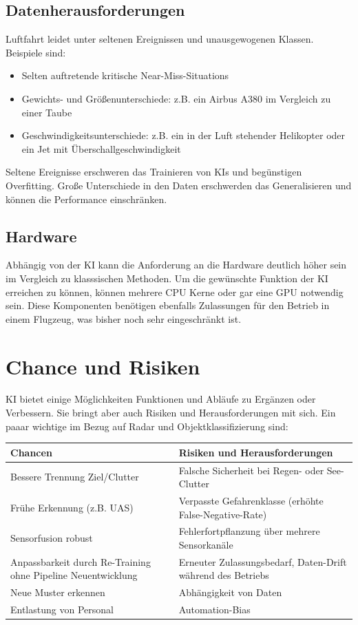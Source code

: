 \subsection{Datenherausforderungen}
Luftfahrt leidet unter seltenen Ereignissen und unausgewogenen Klassen. Beispiele sind:
\begin{itemize}
  \item Selten auftretende kritische Near-Miss-Situations
  \item Gewichts- und Größenunterschiede: z.B. ein Airbus A380 im Vergleich zu einer Taube
  \item Geschwindigkeitsunterschiede: z.B. ein in der Luft stehender Helikopter oder ein Jet mit Überschallgeschwindigkeit
\end{itemize}
Seltene Ereignisse erschweren das Trainieren von KIs und begünstigen Overfitting. Große Unterschiede in den Daten erschwerden 
das Generalisieren und können die Performance einschränken.
\subsection{Hardware}
Abhängig von der KI kann die Anforderung an die Hardware deutlich höher sein im Vergleich zu klasssischen Methoden.
Um die gewünschte Funktion der KI erreichen zu können, können mehrere CPU Kerne oder gar eine GPU notwendig sein. 
Diese Komponenten benötigen ebenfalls Zulassungen für den Betrieb in einem Flugzeug, was bisher noch sehr eingeschränkt ist.

\section{Chance und Risiken}
KI bietet einige Möglichkeiten Funktionen und Abläufe zu Ergänzen oder Verbessern. Sie bringt aber 
auch Risiken und Herausforderungen mit sich. Ein paaar wichtige im Bezug auf Radar und Objektklassifizierung sind:

\begin{tabular}{p{} p{}}
\textbf{Chancen} & \textbf{Risiken und Herausforderungen} \\ \hline
Bessere Trennung Ziel/Clutter & Falsche Sicherheit bei Regen- oder See-Clutter \\[0.5em]

Frühe Erkennung (z.B. UAS) & Verpasste Gefahrenklasse (erhöhte False-Negative-Rate) \\[0.5em]

Sensorfusion robust & Fehlerfortpflanzung über mehrere Sensorkanäle \\[0.5em]

Anpassbarkeit durch Re-Training ohne Pipeline Neuentwicklung & Erneuter Zulassungsbedarf, Daten-Drift während des Betriebs \\[0.5em]

Neue Muster erkennen & Abhängigkeit von Daten\\[0.5em]

Entlastung von Personal & Automation-Bias\\
\end{tabular}

